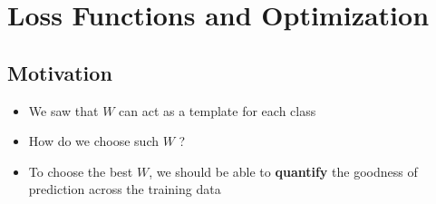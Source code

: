 \section{Loss Functions and Optimization}
\subsection{Motivation}
\begin{itemize}
	\item We saw that $W$ can act as a template for each class
	\item How do we choose such $W$ ?
	\item To choose the best $W$, we should be able to \textbf{quantify} the goodness of prediction across the training data
\end{itemize}

